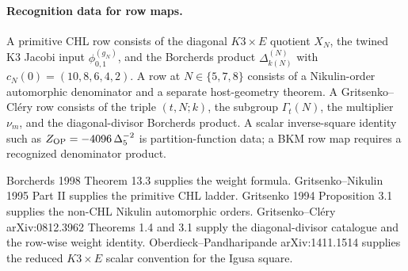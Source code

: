 \paragraph{Recognition data for row maps.}
A primitive CHL row consists of the diagonal \(K3\times E\) quotient
\(X_N\), the twined K3 Jacobi input \(\phi_{0,1}^{(g_N)}\), and the
Borcherds product \(\Delta_{k(N)}^{(N)}\) with
\(c_N(0)=(10,8,6,4,2)\).  A row at \(N\in\{5,7,8\}\) consists of a
Nikulin-order automorphic denominator and a separate host-geometry
theorem.  A Gritsenko--Cl\'ery row consists of the triple \((t,N;k)\),
the subgroup \(\Gamma_t(N)\), the multiplier \(\nu_m\), and the
diagonal-divisor Borcherds product.  A scalar inverse-square identity
such as \(Z_{\mathrm{OP}}=-4096\,\Delta_5^{-2}\) is partition-function data;
a BKM row map requires a recognized denominator product.

Borcherds 1998 Theorem 13.3 supplies the weight formula.
Gritsenko--Nikulin 1995 Part II supplies the primitive CHL ladder.
Gritsenko 1994 Proposition 3.1 supplies the non-CHL Nikulin automorphic
orders.  Gritsenko--Cl\'ery arXiv:0812.3962 Theorems 1.4 and 3.1 supply
the diagonal-divisor catalogue and the row-wise weight identity.
Oberdieck--Pandharipande arXiv:1411.1514 supplies the reduced
\(K3\times E\) scalar convention for the Igusa square.
